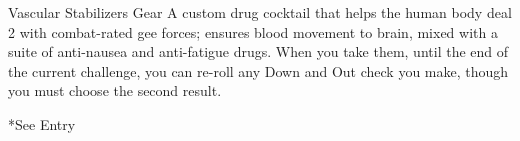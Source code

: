   Vascular Stabilizers          Gear        A custom drug cocktail that helps the human body deal                   2
                                            with combat-rated gee forces; ensures blood movement to
                                             brain, mixed with a suite of anti-nausea and anti-fatigue
                                             drugs. When you take them, until the end of the current
                                             challenge, you can re-roll any Down and Out check you
                                             make, though you must choose the second result.




*See Entry

